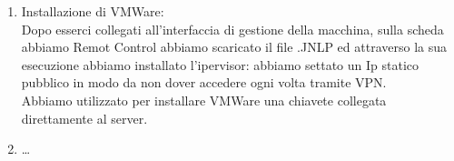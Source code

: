 \documentclass{article}
\begin{document}
\begin{enumerate}
    \item Installazione di VMWare: \\
    Dopo esserci collegati all'interfaccia di gestione della macchina, sulla scheda abbiamo
    Remot Control abbiamo scaricato il file .JNLP ed attraverso la sua esecuzione
    abbiamo installato l'ipervisor: abbiamo settato un Ip statico pubblico in modo da non dover
    accedere ogni volta tramite VPN. \\
    Abbiamo utilizzato per installare VMWare una chiavete collegata direttamente al server.
    
    \item \dots 
    \end{enumerate}
\end{document}
